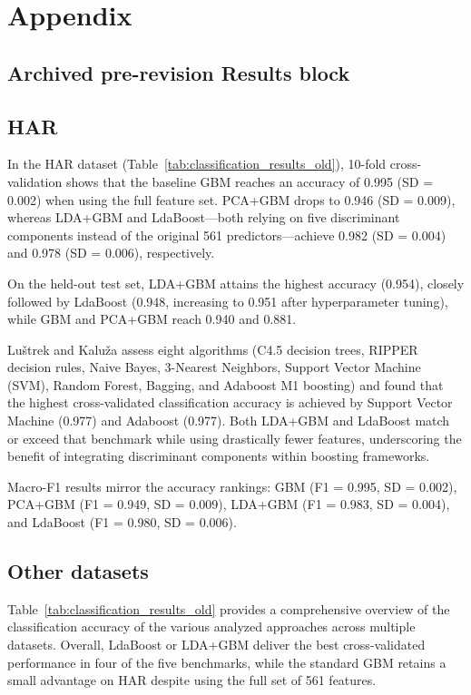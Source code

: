 \documentclass[11pt,a4paper]{article}
\begin{document}
\section*{Appendix}
\appendix
\renewcommand{\thefigure}{A\arabic{figure}}
{\color{red}
\subsection*{Archived pre-revision Results block}
\subsection*{HAR}
In the HAR dataset (Table~\ref{tab:classification_results_old}), 10-fold cross-validation shows that the baseline GBM reaches an accuracy of 0.995 (SD = 0.002) when using the full feature set. PCA+GBM drops to 0.946 (SD = 0.009), whereas LDA+GBM and LdaBoost---both relying on five discriminant components instead of the original 561 predictors---achieve 0.982 (SD = 0.004) and 0.978 (SD = 0.006), respectively.

On the held-out test set, LDA+GBM attains the highest accuracy (0.954), closely followed by LdaBoost (0.948, increasing to 0.951 after hyperparameter tuning), while GBM and PCA+GBM reach 0.940 and 0.881.

Luštrek and Kaluža \citep{luvstrek2009fall} assess eight algorithms (C4.5 decision trees, RIPPER decision rules, Naive Bayes, 3-Nearest Neighbors, Support Vector Machine (SVM), Random Forest, Bagging, and Adaboost M1 boosting) and found that the highest cross-validated classification accuracy is achieved by Support Vector Machine (0.977) and Adaboost (0.977). Both LDA+GBM and LdaBoost match or exceed that benchmark while using drastically fewer features, underscoring the benefit of integrating discriminant components within boosting frameworks.

Macro-F1 results mirror the accuracy rankings: GBM (F1 = 0.995, SD = 0.002), PCA+GBM (F1 = 0.949, SD = 0.009), LDA+GBM (F1 = 0.983, SD = 0.004), and LdaBoost (F1 = 0.980, SD = 0.006).

\subsection*{Other datasets}

Table~\ref{tab:classification_results_old} provides a comprehensive overview of the classification accuracy of the various analyzed approaches across multiple datasets. Overall, LdaBoost or LDA+GBM deliver the best cross-validated performance in four of the five benchmarks, while the standard GBM retains a small advantage on HAR despite using the full set of 561 features.

}
\end{document}
